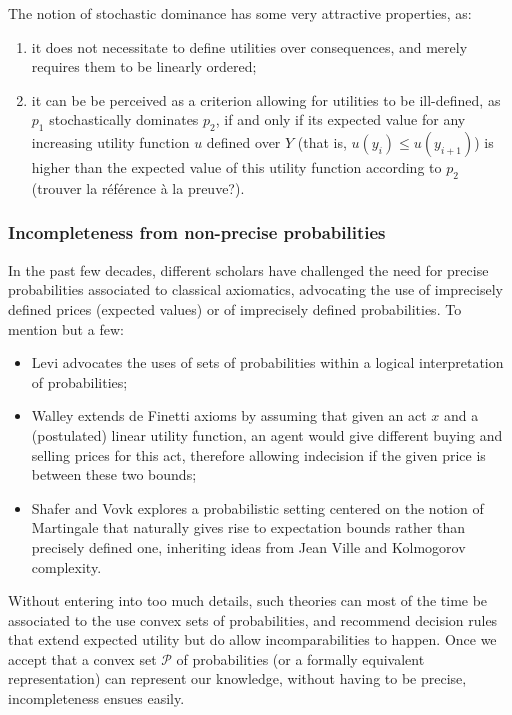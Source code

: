 \documentclass[french, english]{llncs}
\begin{document}
	The notion of stochastic dominance has some very attractive properties, as:
	\begin{enumerate}
		\item it does not necessitate to define utilities over consequences, and merely requires them to be linearly ordered;
		\item it can be be perceived as a criterion allowing for utilities to be ill-defined, as $p_1$ stochastically dominates $p_2$, if and only if its expected value for any increasing utility function $u$ defined over $Y$ (that is, $u(y_i) \leq u(y_{i+1})$)  is higher than the expected value of this utility function according to $p_2$ (trouver la référence à la preuve?). 
	\end{enumerate}
	
	\subsubsection{Incompleteness from non-precise probabilities}
	
	In the past few decades, different scholars have challenged the need for precise probabilities associated to classical axiomatics, advocating the use of imprecisely defined prices (expected values) or of imprecisely defined probabilities. To mention but a few:
	\begin{itemize} 
		\item Levi advocates the uses of sets of probabilities within a logical interpretation of probabilities;
		\item Walley extends de Finetti axioms by assuming that given an act $x$ and a (postulated) linear utility function, an agent would give different buying and selling prices for this act, therefore allowing indecision if the given price is between these two bounds;
		\item Shafer and Vovk explores a probabilistic setting centered on the notion of Martingale that naturally gives rise to expectation bounds rather than precisely defined one, inheriting ideas from Jean Ville and Kolmogorov complexity. 
	\end{itemize}
	Without entering into too much details, such theories can most of the time be associated to the use convex sets of probabilities, and recommend decision rules that extend expected utility but do allow incomparabilities to happen. Once we accept that a convex set $\mathcal{P}$ of probabilities (or a formally equivalent representation) can represent our knowledge, without having to be precise, incompleteness ensues easily. 
	
\end{document}
